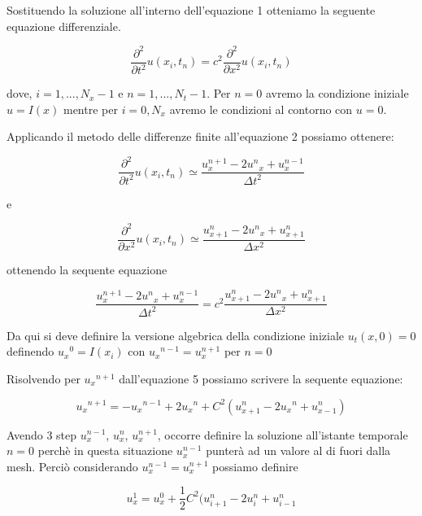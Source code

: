 \documentclass{article}
\begin{document}
Sostituendo la soluzione all'interno dell'equazione 1 otteniamo la seguente equazione differenziale.

\begin{equation}
	\frac{\partial^2}{\partial t^2}u(x_i,t_n) = c^2\frac{\partial^2}{\partial x ^2}u(x_i,t_n)
\end{equation}

dove, $i = 1,...,N_x-1$ e $n = 1,...,N_t-1$.
Per $n=0$ avremo la condizione iniziale $u = I(x)$ mentre per $i={0,N_x}$ avremo le condizioni al contorno con $u = 0$.

Applicando il metodo delle differenze finite all'equazione 2 possiamo ottenere:

\begin{equation}
\frac{\partial^2}{\partial t^2}u(x_i,t_n) \simeq \frac{u^{n+1}_x-2u{^n}_x+u^{n-1}_x}{\Delta t^2}
\end{equation}

e

\begin{equation}
\frac{\partial^2}{\partial x^2}u(x_i,t_n) \simeq \frac{u^n_{x+1}-2u{^n}_x+u^{n}_{x+1}}{\Delta x^2}
\end{equation}

ottenendo la sequente equazione

\begin{equation}
\frac{u^{n+1}_x-2u{^n}_x+u^{n-1}_x}{\Delta t^2} = c^2\frac{u^n_{x+1}-2u{^n}_x+u^{n}_{x+1}}{\Delta x^2}
\end{equation}

Da qui si deve definire la versione algebrica della condizione iniziale $u_t(x,0)=0$ definendo $u_x{^0}=I(x_i)$ con $u{_x}^{n-1} = u_x^{n+1}$ per $n=0$

Risolvendo per $u{_x}^{n+1}$ dall'equazione 5 possiamo scrivere la sequente equazione:

\begin{equation}
u{_x}^{n+1} = -u{_x}^{n-1}+2u{_x}^n+C^2(u_{x+1}^n-2u{_x}^n+u_{x-1}^n)
\end{equation}

Avendo 3 step $u_{x}^{n-1}$, $u_{x}^{n}$, $u_{x}^{n+1}$, occorre definire la soluzione all'istante temporale $n=0$ perchè in questa situazione $u_{x}^{n-1}$ punterà ad un valore al di fuori dalla mesh. Perciò considerando $u_{x}^{n-1} = u_{x}^{n+1}$ possiamo definire

\begin{equation}
u_{x}^1 = u_{x}^0 + \frac{1}{2}C^2(u_{i+1}^n - 2u_{i}^n + u_{i-1}^n
\end{equation}
\end{document}
